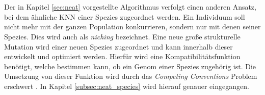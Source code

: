 \\\\
Der in Kapitel \ref{sec:neat} vorgestellte Algorithmus verfolgt einen anderen Ansatz, bei dem ähnliche \ac{KNN} einer Spezies zugeordnet werden. Ein Individuum soll nicht mehr mit der ganzen Population konkurrieren, sondern nur mit denen seiner Spezies. Dies wird auch als \emph{niching} bezeichnet. Eine neue große strukturelle Mutation wird einer neuen Spezies zugeordnet und kann innerhalb dieser entwickelt und optimiert werden. Hierfür wird eine Kompatibilitätsfunktion benötigt, welche bestimmen kann, ob ein Genom einer Spezies zugehörig ist. Die Umsetzung von dieser Funktion wird durch das \emph{Competing Conventions} Problem erschwert \cite{stanley2002evolving}. In Kapitel \ref{subsec:neat_species} wird hierauf genauer eingegangen.
 
